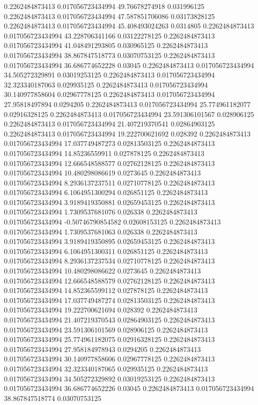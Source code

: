 0.2262484873413 0.017056723434994 49.76678274918 0.031996125
0.2262484873413 0.017056723434994 47.587851706086 0.03173828125
0.2262484873413 0.017056723434994 45.408493024263 0.0314805
0.2262484873413 0.017056723434994 43.228706341166 0.03122278125
0.2262484873413 0.017056723434994 41.048491293805 0.030965125
0.2262484873413 0.017056723434994 38.867847518773 0.03070753125
0.2262484873413 0.017056723434994 36.686774652228 0.03045
0.2262484873413 0.017056723434994 34.505272329891 0.03019253125
0.2262484873413 0.017056723434994 32.323340187063 0.029935125
0.2262484873413 0.017056723434994 30.140977858604 0.02967778125
0.2262484873413 0.017056723434994 27.95818497894 0.0294205
0.2262484873413 0.017056723434994 25.774961182077 0.02916328125
0.2262484873413 0.017056723434994 23.591306101567 0.028906125
0.2262484873413 0.017056723434994 21.407219370541 0.02864903125
0.2262484873413 0.017056723434994 19.222700621692 0.028392
0.2262484873413 0.017056723434994 17.037749487273 0.02813503125
0.2262484873413 0.017056723434994 14.85236559911 0.027878125
0.2262484873413 0.017056723434994 12.666548588577 0.02762128125
0.2262484873413 0.017056723434994 10.480298086619 0.0273645
0.2262484873413 0.017056723434994 8.2936137237511 0.02710778125
0.2262484873413 0.017056723434994 6.1064951300294 0.026851125
0.2262484873413 0.017056723434994 3.9189419350881 0.02659453125
0.2262484873413 0.017056723434994 1.7309537681076 0.026338
0.2262484873413 0.017056723434994 -0.50746790854582 0.02608153125
0.2262484873413 0.017056723434994 1.7309537681063 0.026338
0.2262484873413 0.017056723434994 3.9189419350895 0.02659453125
0.2262484873413 0.017056723434994 6.1064951300311 0.026851125
0.2262484873413 0.017056723434994 8.2936137237534 0.02710778125
0.2262484873413 0.017056723434994 10.480298086622 0.0273645
0.2262484873413 0.017056723434994 12.666548588579 0.02762128125
0.2262484873413 0.017056723434994 14.852365599112 0.027878125
0.2262484873413 0.017056723434994 17.037749487274 0.02813503125
0.2262484873413 0.017056723434994 19.222700621694 0.028392
0.2262484873413 0.017056723434994 21.407219370543 0.02864903125
0.2262484873413 0.017056723434994 23.591306101569 0.028906125
0.2262484873413 0.017056723434994 25.774961182075 0.02916328125
0.2262484873413 0.017056723434994 27.958184978943 0.0294205
0.2262484873413 0.017056723434994 30.140977858606 0.02967778125
0.2262484873413 0.017056723434994 32.323340187065 0.029935125
0.2262484873413 0.017056723434994 34.505272329892 0.03019253125
0.2262484873413 0.017056723434994 36.686774652226 0.03045
0.2262484873413 0.017056723434994 38.867847518774 0.03070753125
